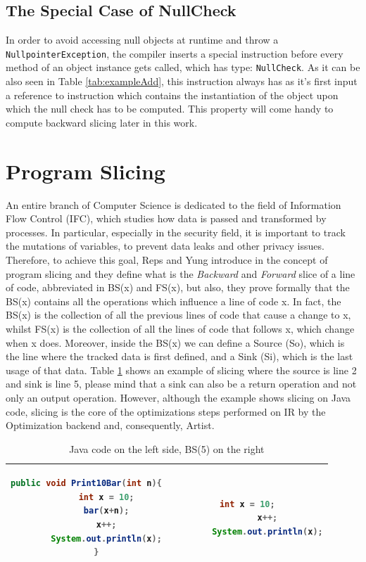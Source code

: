 \subsection{The Special Case of NullCheck}
In order to avoid accessing null objects at runtime and throw a \texttt{NullpointerException}, the compiler inserts a special instruction before every method of an object instance gets called, which has type: \texttt{NullCheck}. As it can be also seen in Table \ref{tab:exampleAdd}, this instruction always has as it's first input a reference to instruction which contains the instantiation of the object upon which the null check has to be computed. This property will come handy to compute backward slicing later in this work.


\section{Program Slicing}
An entire branch of Computer Science is dedicated to the field of Information Flow Control (IFC), which studies how data is passed and transformed by processes. In particular, especially in the security field, it is important to track the mutations of variables, to prevent data leaks and other privacy issues. Therefore, to achieve this goal, Reps and Yung introduce in \cite{slicing} the concept of program slicing and they define what is the \emph{Backward} and \emph{Forward} slice of a line of code, abbreviated in BS(x) and FS(x), but also, they prove formally that the BS(x) contains all the operations which influence a line of code x. In fact, the BS(x) is the collection of all the previous lines of code that cause a change to x, whilst FS(x) is the collection of all the lines of code that follows x, which change when x does. Moreover, inside the BS(x) we can define a Source (So), which is the line where the tracked data is first defined, and a Sink (Si), which is the last usage of that data. Table \ref{tab:slicing} shows an example of slicing where the source is line 2 and sink is line 5, please mind that a sink can also be a return operation and not only an output operation. However, although the example shows slicing on Java code, slicing is the core of the optimizations steps performed on  IR by the Optimization backend and, consequently, Artist.    

\lstset{numbers=none}
\begin{table}[h!]
  \centering
  \begin{tabular}{|c|c|}
  	\hline
	\begin{lstlisting}[language=Java]
	public void Print10Bar(int n){
		int x = 10;
		bar(x+n);
		x++;
		System.out.println(x);
	}
	\end{lstlisting} &
	\begin{lstlisting}[language=Java]
		int x = 10;
		x++;
		System.out.println(x);
	\end{lstlisting} \\
	\hline
  \end{tabular}
    \caption{Java code on the left side, BS(5) on the right}
	\label{tab:slicing}
\end{table}


